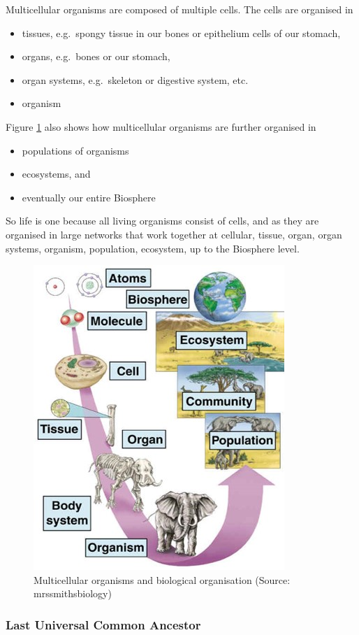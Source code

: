 \documentclass[
  11pt,
]{book}
\providecommand{\tightlist}{%
  \setlength{\itemsep}{0pt}\setlength{\parskip}{0pt}}
\begin{document}
Multicellular organisms are composed of multiple cells. The cells are organised in

\begin{itemize}
\tightlist
\item
  tissues, e.g.~spongy tissue in our bones or epithelium cells of our stomach,
\item
  organs, e.g.~bones or our stomach,
\item
  organ systems, e.g.~skeleton or digestive system, etc.
\item
  organism
\end{itemize}

Figure \ref{fig:multiCellular} also shows how multicellular organisms are further organised in

\begin{itemize}
\tightlist
\item
  populations of organisms
\item
  ecosystems, and
\item
  eventually our entire Biosphere
\end{itemize}

So life is one because all living organisms consist of cells, and as they are organised in large networks that work together at cellular, tissue, organ, organ systems, organism, population, ecosystem, up to the Biosphere level.

\begin{figure}

{\centering \includegraphics[width=0.3\linewidth]{./figs/organisationMulticellular} 

}

\caption{Multicellular organisms and biological organisation (Source: mrssmithsbiology)}\label{fig:multiCellular}
\end{figure}

\hypertarget{last-universal-common-ancestor}{%
\subsubsection{Last Universal Common Ancestor}\label{last-universal-common-ancestor}}
\end{document}
